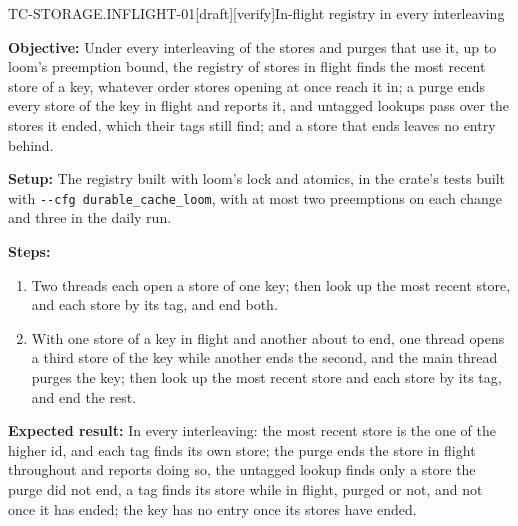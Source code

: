 \begin{requirement}{TC-STORAGE.INFLIGHT-01}[draft][verify]{In-flight registry in every interleaving}


  \textbf{Objective:} Under every interleaving of the stores and purges that
  use it, up to loom's preemption bound, the registry of stores in flight
  finds the most recent store of a key, whatever order stores opening at
  once reach it in; a purge ends every store of the key in flight and
  reports it, and untagged lookups pass over the stores it ended, which
  their tags still find; and a store that ends leaves no entry behind.

  \textbf{Setup:} The registry built with loom's lock and atomics, in the
  crate's tests built with \texttt{-{}-cfg durable\_cache\_loom}, with at most
  two preemptions on each change and three in the daily run.

  \textbf{Steps:}
  \begin{enumerate}
    \item Two threads each open a store of one key; then look up the most
      recent store, and each store by its tag, and end both.
    \item With one store of a key in flight and another about to end, one
      thread opens a third store of the key while another ends the second,
      and the main thread purges the key; then look up the most recent
      store and each store by its tag, and end the rest.
  \end{enumerate}

  \textbf{Expected result:} In every interleaving: the most recent store is
  the one of the higher id, and each tag finds its own store; the purge
  ends the store in flight throughout and reports doing so, the untagged
  lookup finds only a store the purge did not end, a tag finds its store
  while in flight, purged or not, and not once it has ended; the key has no
  entry once its stores have ended.



\end{requirement}

